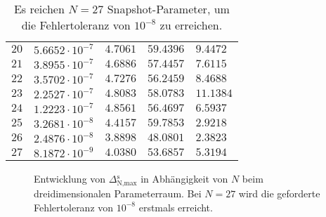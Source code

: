 \begin{table}[h!]
\begin{center}
\begin{tabular}{r|llll}
            $20$ & $5.6652 \cdot 10^{-7}$ & $4.7061$ & $59.4396$ & $9.4472$ \\
            $21$ & $3.8955 \cdot 10^{-7}$ & $4.6886$ & $57.4457$ & $7.6115$ \\
            $22$ & $3.5702 \cdot 10^{-7}$ & $4.7276$ & $56.2459$ & $8.4688$ \\
            $23$ & $2.2527 \cdot 10^{-7}$ & $4.8083$ & $58.0783$ & $11.1384$ \\
            $24$ & $1.2223 \cdot 10^{-7}$ & $4.8561$ & $56.4697$ & $6.5937$ \\
            $25$ & $3.2681 \cdot 10^{-8}$ & $4.4157$ & $59.7853$ & $2.9218$ \\
            $26$ & $2.4876 \cdot 10^{-8}$ & $3.8898$ & $48.0801$ & $2.3823$ \\
            $27$ & $8.1872 \cdot 10^{-9}$ & $4.0380$ & $53.6857$ & $5.3194$
        \end{tabular}
        \caption{Es reichen $N = 27$ Snapshot-Parameter, um die Fehlertoleranz von $10^{-8}$ zu erreichen.}
        \label{tab:dreidim}
    \end{center}
\end{table}

\begin{figure}[h!]
    \begin{center}
        \small
        \setlength\figureheight{5cm}
        \setlength{}
        
    \end{center}
    \caption{Entwicklung von $\Delta{}^\text{s}_{\text{N,max}}$ in Abhängigkeit von $N$ beim dreidimensionalen Parameterraum. Bei $N = 27$ wird die geforderte Fehlertoleranz von $10^{-8}$ erstmals erreicht.}
    \label{fig:3par_plot_fehler_nach_N}
\end{figure}




